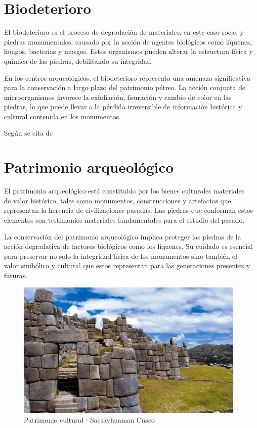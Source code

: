\section{Biodeterioro}

El biodeterioro es el proceso de degradación de materiales, en este caso rocas y piedras monumentales, causado por la acción de agentes biológicos como líquenes, hongos, bacterias y musgos. Estos organismos pueden alterar la estructura física y química de las piedras, debilitando su integridad.

En los centros arqueológicos, el biodeterioro representa una amenaza significativa para la conservación a largo plazo del patrimonio pétreo. La acción conjunta de microorganismos favorece la exfoliación, fisuración y cambio de color en las piedras, lo que puede llevar a la pérdida irreversible de información histórica y cultural contenida en los monumentos.

Según se cita de \cite{Gamboa2017}


\section{Patrimonio arqueológico}

El patrimonio arqueológico está constituido por los bienes culturales materiales de valor histórico, tales como monumentos, construcciones y artefactos que representan la herencia de civilizaciones pasadas. Las piedras que conforman estos elementos son testimonios materiales fundamentales para el estudio del pasado.

La conservación del patrimonio arqueológico implica proteger las piedras de la acción degradativa de factores biológicos como los líquenes. Su cuidado es esencial para preservar no solo la integridad física de los monumentos sino también el valor simbólico y cultural que estos representan para las generaciones presentes y futuras.

\begin{figure}[h]
	\centering
	\includegraphics[width=0.5\linewidth]{media/patrimonio-cultural}
	\caption{Patrimonio cultural - Sacsayhuaman Cusco}
	\label{fig:patrimonio-cultural}
\end{figure}


